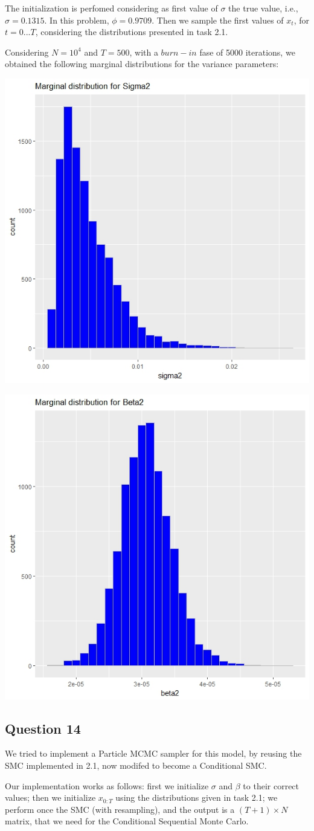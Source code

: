 \documentclass[]{article}
\begin{document}
The initialization is perfomed considering as first value of $\sigma$ the true value, i.e., $\sigma = 0.1315$. In this problem, $\phi = 0.9709$. Then we sample the first values of $x_t$, for $t=0...T$, considering the distributions presented in task 2.1.


Considering $N=10^4$ and $T=500$, with a $burn-in$ fase of 5000 iterations, we obtained the following marginal distributions for the variance parameters:

\begin{center}

	\includegraphics[width=.4\textwidth]{task5/Gibbs_sigma2.jpeg}

	\includegraphics[width=.4\textwidth]{task5/Gibbs_beta2.jpeg}

\end{center}



\subsection*{Question 14}

We tried to implement a Particle MCMC sampler for this model, by reusing the SMC implemented in 2.1, now modifed to become a Conditional SMC. 


Our implementation works as follows: first we initialize $\sigma$ and $\beta$ to their correct values; then we initialize $x_{0:T}$ using the distributions given in task 2.1; we perform once the SMC (with resampling), and the output is a $(T+1) \times N$ matrix, that we need for the Conditional Sequential Monte Carlo.
\end{document}
